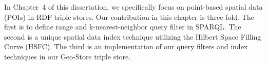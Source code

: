 In Chapter~4 of this dissertation, we specifically focus on point-based spatial data (POIs) in RDF triple stores. Our contribution in this chapter is three-fold. The first is to define range and k-nearest-neighbor query filter in SPARQL. The second is a unique spatial data index technique utilizing the Hilbert Space Filling Curve (HSFC). The third is an implementation of our query filters and index techniques in our Geo-Store triple store. 